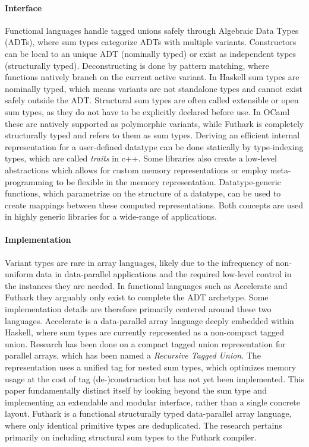 \documentclass{article}
\begin{document}
\paragraph{Interface}

Functional languages handle tagged unions safely through Algebraic Data Types (ADTs), where sum types categorize ADTs with multiple variants.
Constructors can be local to an unique ADT (nominally typed) or exist as independent types (structurally typed).
Deconstructing is done by pattern matching, where functions natively branch on the current active variant.
In Haskell sum types are nominally typed, which means variants are not standalone types and cannot exist safely outside the ADT.
Structural sum types are often called extensible or open sum types, as they do not have to be explicitly declared before use.
In OCaml these are natively supported as polymorphic variants, while Futhark is completely structurally typed and refers to them as sum types.
Deriving an efficient internal representation for a user-defined datatype can be done statically by type-indexing types\cite{associated-types}, which are called {\it traits} in c++.
Some libraries also create a low-level abstractions which allows for custom memory representations \cite{llama} or employ meta-programming to be flexible in the memory representation.
Datatype-generic functions, which parametrize on the structure of a datatype, can be used to create mappings between these computed representations.
Both concepts are used in highly generic libraries for a wide-range of applications\cite{generic-programming}. 

\paragraph{Implementation}

Variant types are rare in array languages, likely due to the infrequency of non-uniform data in data-parallel applications and the required low-level control in the instances they are needed.
In functional languages such as Accelerate and Futhark they arguably only exist to complete the ADT archetype.
Some implementation details are therefore primarily centered around these two languages.
Accelerate is a data-parallel array language deeply embedded within Haskell, where sum types are currently represented as a non-compact tagged union.
Research has been done on a compact tagged union representation for parallel arrays, which has been named a {\it Recursive Tagged Union}\cite{accelerate-sum-types}.
The representation uses a unified tag for nested sum types, which optimizes memory usage at the cost of tag (de-)construction but has not yet been implemented. 
This paper fundamentally distinct itself by looking beyond the sum type and implementing an extendable and modular interface, rather than a single concrete layout. 
Futhark is a functional structurally typed data-parallel array language, where only identical primitive types are deduplicated.
The research pertains primarily on including structural sum types to the Futhark compiler\cite{futhark-sum-types}.
\end{document}
